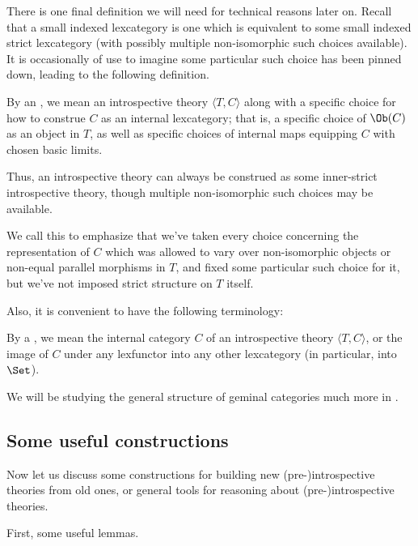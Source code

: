 There is one final definition we will need for technical reasons later on. Recall that a small indexed lexcategory is one which is equivalent to some small indexed strict lexcategory (with possibly multiple non-isomorphic such choices available). It is occasionally of use to imagine some particular such choice has been pinned down, leading to the following definition.

\begin{definition}
By an , we mean an introspective theory $\langle T, C\rangle$ along with a specific choice for how to construe $C$ as an internal lexcategory; that is, a specific choice of $\Ob(C)$ as an object in $T$, as well as specific choices of internal maps equipping $C$ with chosen basic limits.
\end{definition}

Thus, an introspective theory can always be construed as some inner-strict introspective theory, though multiple non-isomorphic such choices may be available. 

We call this  to emphasize that we've taken every choice concerning the representation of $C$ which was allowed to vary over non-isomorphic objects or non-equal parallel morphisms in $T$, and fixed some particular such choice for it, but we've not imposed strict structure on $T$ itself.

Also, it is convenient to have the following terminology:
\begin{definition}
By a , we mean the internal category $C$ of an introspective theory $\langle T, C \rangle$, or the image of $C$ under any lexfunctor into any other lexcategory (in particular, into $\Set$).
\end{definition}
We will be studying the general structure of geminal categories much more in .

\subsection{Some useful constructions}
Now let us discuss some constructions for building new (pre-)introspective theories from old ones, or general tools for reasoning about (pre-)introspective theories.

First, some useful lemmas.

